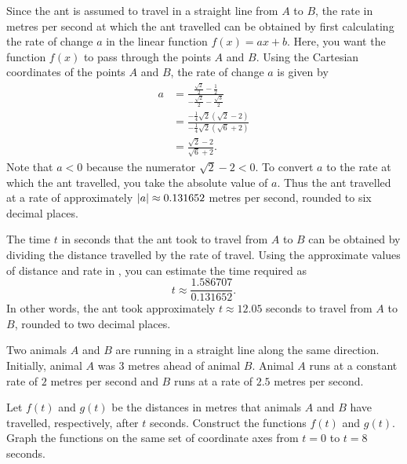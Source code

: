 \documentclass[a4paper,oneside,12pt]{article}
\begin{document}
\begin{problem}
{\begin{solution}
Since the ant is assumed to travel in a straight line from $A$ to $B$,
the rate in metres per second at which the ant travelled can be
obtained by first calculating the rate of change $a$ in the linear
function $f(x) = ax + b$.  Here, you want the function $f(x)$ to pass
through the points $A$ and $B$.  Using the Cartesian coordinates of
the points $A$ and $B$, the rate of change $a$ is given by
\begin{align*}
a
&=
\frac{
  \frac{\sqrt{2}}{2} - \frac{1}{2}
}{
  -\frac{\sqrt{2}}{2} - \frac{\sqrt{3}}{2}
} \\[4pt]
&=
\frac{
  -\frac{1}{4} \sqrt{2} (\sqrt{2} - 2)
}{
  -\frac{1}{4} \sqrt{2} (\sqrt{6} + 2)
} \\[4pt]
&=
\frac{
  \sqrt{2} - 2
}{
  \sqrt{6} + 2
}.
\end{align*}
Note that $a < 0$ because the numerator $\sqrt{2} - 2 < 0$.  To
convert $a$ to the rate at which the ant travelled, you take the
absolute value of $a$.  Thus the ant travelled at a rate of
approximately $\lvert a\rvert \approx 0.131652$ metres per second,
rounded to six decimal places.

The time $t$ in seconds that the ant took to travel from $A$ to $B$
can be obtained by dividing the distance travelled by the rate of
travel.  Using the approximate values of distance and rate
in ,
you can estimate the time required as
\[
t
\approx
\frac{1.586707}{0.131652}.
\]
In other words, the ant took approximately $t \approx 12.05$ seconds
to travel from $A$ to $B$, rounded to two decimal places.
\end{solution}
}{}

\item Two animals $A$ and $B$ are running in a straight line along the
  same direction.  Initially, animal $A$ was $3$ metres ahead of
  animal $B$.  Animal $A$ runs at a constant rate of $2$ metres per
  second and $B$ runs at a rate of $2.5$ metres per second.
  \begin{packedenum}
  \item\label{subprob:rat_race_linear_functions}
    Let $f(t)$ and $g(t)$ be the distances in metres that animals $A$
    and $B$ have travelled, respectively, after $t$ seconds.
    Construct the functions $f(t)$ and $g(t)$.  Graph the functions on
    the same set of coordinate axes from $t = 0$ to $t = 8$ seconds.


\end{packedenum}
\end{problem}
\end{document}
